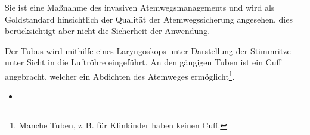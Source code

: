 {%
 Sie ist eine Maßnahme des invasiven
Atemwegsmanagements und wird als Goldstandard hinsichtlich
der Qualität der Atemwegssicherung angesehen, dies
berücksichtigt aber nicht die Sicherheit der Anwendung.

Der Tubus wird mithilfe eines Laryngoskops unter Darstellung
der Stimmritze unter Sicht in die Luftröhre eingeführt.
An den gängigen Tuben ist ein Cuff angebracht, welcher ein
Abdichten des Atemweges ermöglicht\footnote{Manche Tuben,
z.\,B. für Klinkinder haben keinen Cuff.}.
}
{%
\begin{itemize}
  \item
\end{itemize}
}


